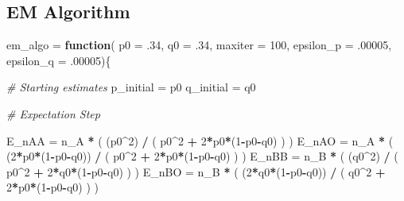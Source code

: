 \documentclass[]{article}
\newenvironment{Shaded}{\begin{snugshade}}{\end{snugshade}}
\newcommand{\DataTypeTok}[1]{\textcolor[rgb]{0.13,0.29,0.53}{#1}}
\newcommand{\DecValTok}[1]{\textcolor[rgb]{0.00,0.00,0.81}{#1}}
\newcommand{\StringTok}[1]{\textcolor[rgb]{0.31,0.60,0.02}{#1}}
\newcommand{\CommentTok}[1]{\textcolor[rgb]{0.56,0.35,0.01}{\textit{#1}}}
\newcommand{\ControlFlowTok}[1]{\textcolor[rgb]{0.13,0.29,0.53}{\textbf{#1}}}
\newcommand{\OperatorTok}[1]{\textcolor[rgb]{0.81,0.36,0.00}{\textbf{#1}}}
\newcommand{\NormalTok}[1]{#1}
\begin{document}
\subsection{EM Algorithm}\label{em-algorithm}

\begin{Shaded}
\begin{Highlighting}[]
\NormalTok{em_algo =}\StringTok{ }\ControlFlowTok{function}\NormalTok{( }\DataTypeTok{p0 =}\NormalTok{ .}\DecValTok{34}\NormalTok{,  }\DataTypeTok{q0 =}\NormalTok{ .}\DecValTok{34}\NormalTok{, }\DataTypeTok{maxiter =} \DecValTok{100}\NormalTok{, }\DataTypeTok{epsilon_p =}\NormalTok{ .}\DecValTok{00005}\NormalTok{,  }\DataTypeTok{epsilon_q =}\NormalTok{ .}\DecValTok{00005}\NormalTok{)\{}

      \CommentTok{# Starting estimates}
\NormalTok{      p_initial =}\StringTok{ }\NormalTok{p0}
\NormalTok{      q_initial =}\StringTok{ }\NormalTok{q0}
      
      \CommentTok{# Expectation Step}
                
\NormalTok{      E_nAA =}\StringTok{ }\NormalTok{n_A }\OperatorTok{*}\StringTok{ }\NormalTok{( (p0}\OperatorTok{^}\DecValTok{2}\NormalTok{) }\OperatorTok{/}\StringTok{ }\NormalTok{( p0}\OperatorTok{^}\DecValTok{2} \OperatorTok{+}\StringTok{ }\DecValTok{2}\OperatorTok{*}\NormalTok{p0}\OperatorTok{*}\NormalTok{(}\DecValTok{1}\OperatorTok{-}\NormalTok{p0}\OperatorTok{-}\NormalTok{q0) ) )}
\NormalTok{      E_nAO =}\StringTok{ }\NormalTok{n_A }\OperatorTok{*}\StringTok{ }\NormalTok{( (}\DecValTok{2}\OperatorTok{*}\NormalTok{p0}\OperatorTok{*}\NormalTok{(}\DecValTok{1}\OperatorTok{-}\NormalTok{p0}\OperatorTok{-}\NormalTok{q0)) }\OperatorTok{/}\StringTok{ }\NormalTok{( p0}\OperatorTok{^}\DecValTok{2} \OperatorTok{+}\StringTok{ }\DecValTok{2}\OperatorTok{*}\NormalTok{p0}\OperatorTok{*}\NormalTok{(}\DecValTok{1}\OperatorTok{-}\NormalTok{p0}\OperatorTok{-}\NormalTok{q0) ) )}
\NormalTok{      E_nBB =}\StringTok{ }\NormalTok{n_B }\OperatorTok{*}\StringTok{ }\NormalTok{( (q0}\OperatorTok{^}\DecValTok{2}\NormalTok{) }\OperatorTok{/}\StringTok{ }\NormalTok{( p0}\OperatorTok{^}\DecValTok{2} \OperatorTok{+}\StringTok{ }\DecValTok{2}\OperatorTok{*}\NormalTok{q0}\OperatorTok{*}\NormalTok{(}\DecValTok{1}\OperatorTok{-}\NormalTok{p0}\OperatorTok{-}\NormalTok{q0) ) )}
\NormalTok{      E_nBO =}\StringTok{ }\NormalTok{n_B }\OperatorTok{*}\StringTok{ }\NormalTok{( (}\DecValTok{2}\OperatorTok{*}\NormalTok{q0}\OperatorTok{*}\NormalTok{(}\DecValTok{1}\OperatorTok{-}\NormalTok{p0}\OperatorTok{-}\NormalTok{q0)) }\OperatorTok{/}\StringTok{ }\NormalTok{( q0}\OperatorTok{^}\DecValTok{2} \OperatorTok{+}\StringTok{ }\DecValTok{2}\OperatorTok{*}\NormalTok{p0}\OperatorTok{*}\NormalTok{(}\DecValTok{1}\OperatorTok{-}\NormalTok{p0}\OperatorTok{-}\NormalTok{q0) ) )}
      

\end{Highlighting}
\end{Shaded}
\end{document}
